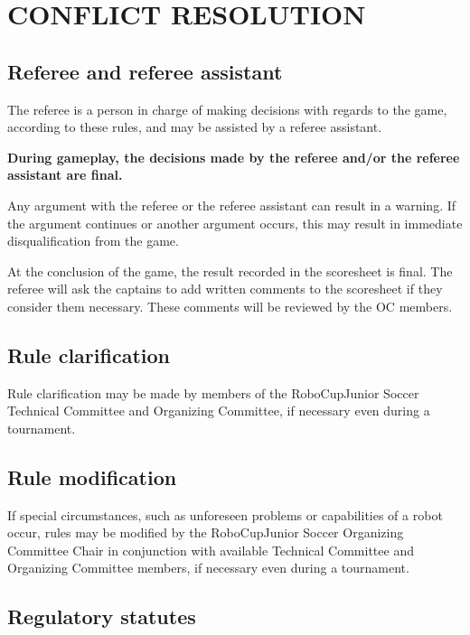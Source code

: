 \documentclass{article}
\begin{document}
\section{CONFLICT RESOLUTION \label{ref-047}}

\subsection{Referee and referee assistant \label{ref-048}}

The referee is a person in charge of making decisions with regards to the game, according to these rules, and may be assisted by a referee assistant.

\textbf{During gameplay, the decisions made by the referee and/or the referee assistant are final.}

Any argument with the referee or the referee assistant can result in a warning. If the argument continues or another argument occurs, this may result in immediate disqualification from the game.

At the conclusion of the game, the result recorded in the scoresheet is final. The referee will ask the captains to add written comments to the scoresheet if they consider them necessary. These comments will be reviewed by the OC members.

\subsection{ Rule clarification \label{ref-049}}

Rule clarification may be made by members of the RoboCupJunior Soccer Technical Committee and Organizing Committee, if necessary even during a tournament.

\subsection{ Rule modification \label{ref-050}}

If special circumstances, such as unforeseen problems or capabilities of a robot occur, rules may be modified by the RoboCupJunior Soccer Organizing Committee Chair in conjunction with available Technical Committee and Organizing Committee members, if necessary even during a tournament.

\subsection{ Regulatory statutes \label{ref-051}}
\end{document}
